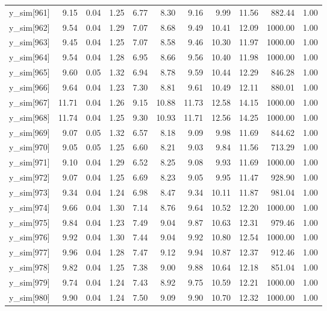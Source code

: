 \begin{table}[ht]
\begin{tabular}{rrrrrrrrrrr}
  y\_sim[961] & 9.15 & 0.04 & 1.25 & 6.77 & 8.30 & 9.16 & 9.99 & 11.56 & 882.44 & 1.00 \\ 
  y\_sim[962] & 9.54 & 0.04 & 1.29 & 7.07 & 8.68 & 9.49 & 10.41 & 12.09 & 1000.00 & 1.00 \\ 
  y\_sim[963] & 9.45 & 0.04 & 1.25 & 7.07 & 8.58 & 9.46 & 10.30 & 11.97 & 1000.00 & 1.00 \\ 
  y\_sim[964] & 9.54 & 0.04 & 1.28 & 6.95 & 8.66 & 9.56 & 10.40 & 11.98 & 1000.00 & 1.00 \\ 
  y\_sim[965] & 9.60 & 0.05 & 1.32 & 6.94 & 8.78 & 9.59 & 10.44 & 12.29 & 846.28 & 1.00 \\ 
  y\_sim[966] & 9.64 & 0.04 & 1.23 & 7.30 & 8.81 & 9.61 & 10.49 & 12.11 & 880.01 & 1.00 \\ 
  y\_sim[967] & 11.71 & 0.04 & 1.26 & 9.15 & 10.88 & 11.73 & 12.58 & 14.15 & 1000.00 & 1.00 \\ 
  y\_sim[968] & 11.74 & 0.04 & 1.25 & 9.30 & 10.93 & 11.71 & 12.56 & 14.25 & 1000.00 & 1.00 \\ 
  y\_sim[969] & 9.07 & 0.05 & 1.32 & 6.57 & 8.18 & 9.09 & 9.98 & 11.69 & 844.62 & 1.00 \\ 
  y\_sim[970] & 9.05 & 0.05 & 1.25 & 6.60 & 8.21 & 9.03 & 9.84 & 11.56 & 713.29 & 1.00 \\ 
  y\_sim[971] & 9.10 & 0.04 & 1.29 & 6.52 & 8.25 & 9.08 & 9.93 & 11.69 & 1000.00 & 1.00 \\ 
  y\_sim[972] & 9.07 & 0.04 & 1.25 & 6.69 & 8.23 & 9.05 & 9.95 & 11.47 & 928.90 & 1.00 \\ 
  y\_sim[973] & 9.34 & 0.04 & 1.24 & 6.98 & 8.47 & 9.34 & 10.11 & 11.87 & 981.04 & 1.00 \\ 
  y\_sim[974] & 9.66 & 0.04 & 1.30 & 7.14 & 8.76 & 9.64 & 10.52 & 12.20 & 1000.00 & 1.00 \\ 
  y\_sim[975] & 9.84 & 0.04 & 1.23 & 7.49 & 9.04 & 9.87 & 10.63 & 12.31 & 979.46 & 1.00 \\ 
  y\_sim[976] & 9.92 & 0.04 & 1.30 & 7.44 & 9.04 & 9.92 & 10.80 & 12.54 & 1000.00 & 1.00 \\ 
  y\_sim[977] & 9.96 & 0.04 & 1.28 & 7.47 & 9.12 & 9.94 & 10.87 & 12.37 & 912.46 & 1.00 \\ 
  y\_sim[978] & 9.82 & 0.04 & 1.25 & 7.38 & 9.00 & 9.88 & 10.64 & 12.18 & 851.04 & 1.00 \\ 
  y\_sim[979] & 9.74 & 0.04 & 1.24 & 7.43 & 8.92 & 9.75 & 10.59 & 12.21 & 1000.00 & 1.00 \\ 
  y\_sim[980] & 9.90 & 0.04 & 1.24 & 7.50 & 9.09 & 9.90 & 10.70 & 12.32 & 1000.00 & 1.00 \\ 

\end{tabular}
\end{table}
